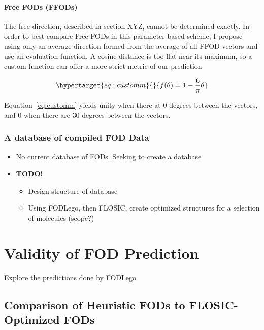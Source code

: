 \documentclass[12pt,a4paper,]{report}
\providecommand{\tightlist}{%
  \setlength{\itemsep}{0pt}\setlength{\parskip}{0pt}}
\begin{document}
\subsubsection{Free FODs (FFODs)}\label{free-fods-ffods}

The free-direction, described in section XYZ, cannot be determined
exactly. In order to best compare Free FODs in this parameter-based
scheme, I propose using only an average direction formed from the
average of all FFOD vectors and use an evaluation function. A cosine
distance is too flat near its maximum, so a custom function can offer a
more strict metric of our prediction

\begin{equation}\protect\hypertarget{eq:customm}{}{f(\theta) = 1 - \frac{6}{\pi}\theta}\label{eq:customm}\end{equation}

Equation~\ref{eq:customm} yields unity when there at \(0\) degrees
between the vectors, and 0 when there are \(30\) degrees between the
vectors.

\subsection{A database of compiled FOD
Data}\label{a-database-of-compiled-fod-data}

\begin{itemize}
\tightlist
\item
  No current database of FODs. Seeking to create a database
\item
  \textbf{TODO!}

  \begin{itemize}
  \tightlist
  \item
    Design structure of database
  \item
    Using FODLego, then FLOSIC, create optimized structures for a
    selection of molecules (scope?)
  \end{itemize}
\end{itemize}

\chapter{Validity of FOD Prediction}\label{validity-of-fod-prediction}

Explore the predictions done by FODLego

\section{Comparison of Heuristic FODs to FLOSIC-Optimized
FODs}\label{comparison-of-heuristic-fods-to-flosic-optimized-fods}
\end{document}
